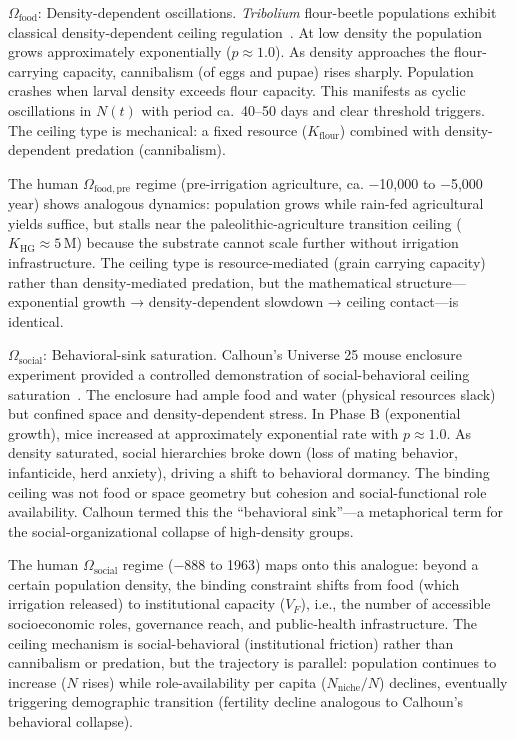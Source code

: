 \documentclass[11pt]{article}
\begin{document}
$\Omega_{\mathrm{food}}$: Density-dependent oscillations.
\textit{Tribolium} flour-beetle populations exhibit classical density-dependent ceiling regulation~\cite{dennis1995,costantino1997}.
At low density the population grows approximately exponentially ($p \approx 1.0$). As density approaches the
flour-carrying capacity, cannibalism (of eggs and pupae) rises sharply. Population crashes when larval density
exceeds flour capacity. This manifests as cyclic oscillations in $N(t)$ with period ca.\ 40--50 days and clear
threshold triggers. The ceiling type is mechanical: a fixed resource ($K_{\mathrm{flour}}$) combined with
density-dependent predation (cannibalism).

The human $\Omega_{\mathrm{food,pre}}$ regime (pre-irrigation agriculture, ca. $-$10,000 to $-$5,000 year)
shows analogous dynamics: population grows while rain-fed agricultural yields suffice, but stalls near the
paleolithic-agriculture transition ceiling ($K_{\mathrm{HG}} \approx 5\,\mathrm{M}$) because the substrate
cannot scale further without irrigation infrastructure. The ceiling type is resource-mediated (grain carrying
capacity) rather than density-mediated predation, but the mathematical structure---exponential growth → density-dependent
slowdown → ceiling contact---is identical.

$\Omega_{\mathrm{social}}$: Behavioral-sink saturation.
Calhoun's Universe 25 mouse enclosure experiment provided a controlled demonstration of social-behavioral ceiling
saturation~\cite{calhoun1973}. The enclosure had ample food and water (physical resources slack) but confined space
and density-dependent stress. In Phase B (exponential growth), mice increased at approximately exponential rate with
$p \approx 1.0$. As density saturated, social hierarchies broke down (loss of mating behavior, infanticide, herd
anxiety), driving a shift to behavioral dormancy. The binding ceiling was not food or space geometry but cohesion
and social-functional role availability. Calhoun termed this the ``behavioral sink''---a metaphorical term for
the social-organizational collapse of high-density groups.

The human $\Omega_{\mathrm{social}}$ regime ($-$888 to 1963) maps onto this analogue: beyond a certain population density,
the binding constraint shifts from food (which irrigation released) to institutional capacity ($V_F$), i.e.,
the number of accessible socioeconomic roles, governance reach, and public-health infrastructure. The ceiling mechanism
is social-behavioral (institutional friction) rather than cannibalism or predation, but the trajectory is parallel:
population continues to increase ($N$ rises) while role-availability per capita ($N_{\mathrm{niche}}/N$) declines,
eventually triggering demographic transition (fertility decline analogous to Calhoun's behavioral collapse).
\end{document}
